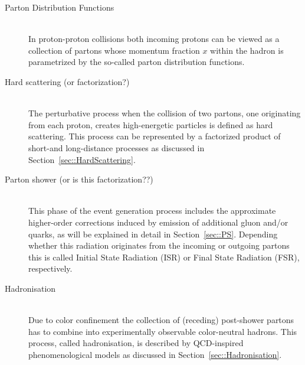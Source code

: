 \begin{myindentpar}
  \begin{description}
    \item[Parton Distribution Functions] \hfill \\
      In proton-proton collisions both incoming protons can be viewed as a collection of partons whose momentum fraction $x$ within the hadron is parametrized by the so-called parton distribution functions.
    \item[Hard scattering (or factorization?)] \hfill \\
      The perturbative process when the collision of two partons, one originating from each proton, creates high-energetic particles is defined as hard scattering. This process can be represented by a factorized product of short-and long-distance processes as discussed in Section~\ref{sec::HardScattering}.
    \item[Parton shower (or is this factorization??)] \hfill \\
      This phase of the event generation process includes the approximate higher-order corrections induced by emission of additional gluon and/or quarks, as will be explained in detail in Section~\ref{sec::PS}. Depending whether this radiation originates from the incoming or outgoing partons this is called Initial State Radiation (ISR) or Final State Radiation (FSR), respectively.
    \item[Hadronisation] \hfill \\
      Due to color confinement the collection of (receding) post-shower partons has to combine into experimentally observable color-neutral hadrons. This process, called hadronisation, is described by QCD-inspired phenomenological models as discussed in Section~\ref{sec::Hadronisation}.
  \end{description}
\end{myindentpar}


